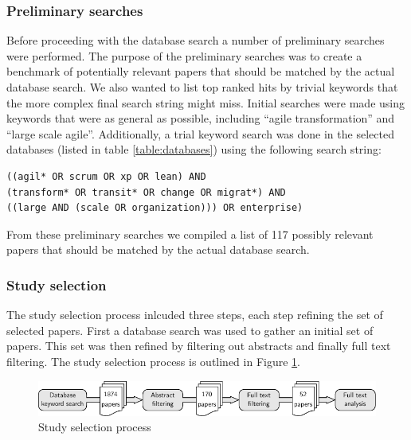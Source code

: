 \documentclass[preprint,authoryear,12pt]{elsarticle}
\begin{document}
\subsubsection{Preliminary searches}


Before proceeding with the database search a number of preliminary searches were
performed. The purpose of the preliminary searches was to create a benchmark of
potentially relevant papers that should be matched by the actual database
search. We also wanted to list top ranked hits by trivial keywords that the
more complex final search string might miss. Initial searches were made using
keywords that were as general as possible, including ``agile transformation''
and ``large scale agile''. Additionally, a trial keyword search was done in the
selected databases (listed in table \ref{table:databases}) using the following
search string:

\begin{verbatim}
((agil* OR scrum OR xp OR lean) AND
(transform* OR transit* OR change OR migrat*) AND
((large AND (scale OR organization))) OR enterprise)
\end{verbatim}

From these preliminary searches we compiled a list of 117 possibly relevant
papers that should be matched by the actual database search.

\subsubsection{Study selection}

The study selection process inlcuded three steps, each step refining the set of
selected papers. First a database search was used to gather an initial set of
papers. This set was then refined by filtering out abstracts and finally full
text filtering. The study selection process is outlined in Figure
\ref{fig:selectionprocess}.

\begin{figure}[b]
  \begin{center}
    \includegraphics[width=1\textwidth]{graphics/research_process.pdf}
    \caption{Study selection process}
    \label{fig:selectionprocess}
  \end{center}
\end{figure}
\end{document}
